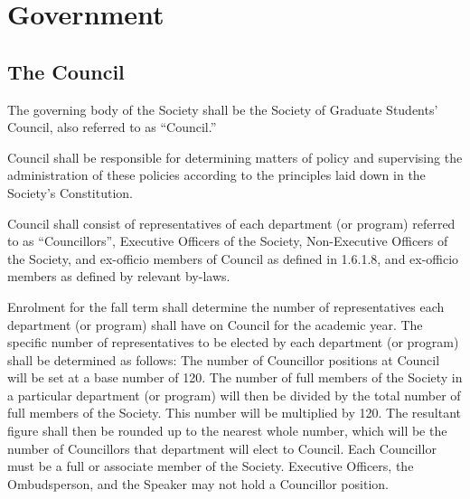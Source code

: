 \newpage

\section{Government}
\subsection{The Council}
	\begin{longenum}[label*=\thesubsection.\arabic*., align=left]
	\item The governing body of the Society shall be the Society of Graduate Students' Council, also referred to as ``Council.''
	
	\item Council shall be responsible for determining matters of policy and supervising the administration of these policies according to the principles laid down in the Society's Constitution. 
    
    \item Council shall consist of representatives of each department (or program) referred to as ``Councillors'', Executive Officers of the
Society, Non-Executive Officers of the Society, and ex-officio members of Council as defined in 1.6.1.8, and ex-officio members as
defined by relevant by-laws.   
\item Enrolment for the fall term shall determine the number of representatives each department (or program) shall have on Council for the academic year. The specific number of representatives to be elected by each department (or program) shall be determined as follows: The number of Councillor positions at Council will be set at a base number of 120. The number of full members of the Society in a particular department (or program) will then be divided by the total number of full members of the Society. This number will be multiplied by 120. The resultant figure shall then be rounded up to the nearest whole number, which will be the number of Councillors that department will elect to Council. Each Councillor must be a full or associate member of the Society. Executive Officers, the Ombudsperson, and the Speaker may not hold a Councillor position. 
    

\end{longenum}

